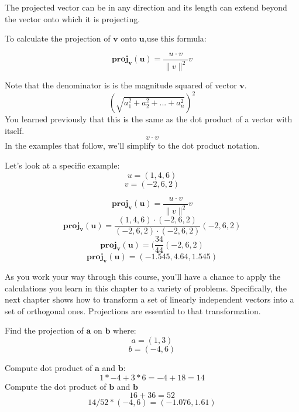 
The projected vector can be in any direction and its length can extend beyond the vector onto which it is projecting.


To calculate the projection of 
$\mathbf{v}$ onto $\mathbf{u}$,use this formula:

$$\mathbf{proj}_\mathbf{v}(\mathbf{u}) = \frac{u\cdot v}{\parallel{v}\parallel ^2}v$$

Note that the denominator is is the magnitude squared of vector $\mathbf{v}$.
$$(\sqrt{a_1^2 + a_2^2 + ... + a_n^2} )^2$$
You learned previously that this is the same as the dot product of a vector with itself.
$${v\cdot v}$$
In the examples that follow, we'll simplify to the dot product notation.

Let's look at a specific example:
$$u = (1,4,6)$$ 
$$v = (-2,6,2)$$ 

$$\mathbf{proj}_\mathbf{v}(\mathbf{u}) = \frac{u\cdot v}{\parallel {v}\parallel ^2}v$$
$$\mathbf{proj}_\mathbf{v}(\mathbf{u}) = \frac{(1,4,6)\cdot(-2,6,2)}{ (-2,6,2)\cdot (-2,6,2)}(-2,6,2)$$
$$\mathbf{proj}_\mathbf{v}(\mathbf{u}) = (\frac{34}{44}(-2,6,2)$$
$$\mathbf{proj}_\mathbf{v}(\mathbf{u}) = (-1.545, 4.64, 1.545)$$

As you work your way through this course, you'll have a chance to apply the calculations you learn in this chapter to a variety of problems. Specifically, the next chapter shows how to transform a set of linearly independent vectors into a set of orthogonal ones. Projections are essential to that transformation. 

\begin{Exercise}[title={Projections}, label=projections]
	Find the projection of $\mathbf{a}$ on $\mathbf{b}$ where:
	$$a = (1,3)$$
	$$b = (-4,6)$$
\end{Exercise}
\begin{Answer}[ref=projections]
	Compute dot product of $\mathbf{a}$ and $\mathbf{b}$:
	$$1*-4 + 3*6 = -4 +18 = 14$$
	Compute the dot product of $\mathbf{b}$ and $\mathbf{b}$
	$$16 + 36 = 52 $$
	$$14/52 * (-4,6) = (-1.076 , 1.61)$$
\end{Answer}
 
